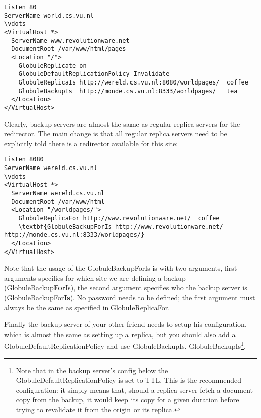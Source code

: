 \documentclass[10pt,a4paper]{article}
\makeatletter
\newenvironment{p}{\@open{P}{}}{\@close{P}}
\newenvironment{p}{}{\par}
\makeatother
\begin{document}
\begin{Verbatim}[label=Your origin server's configuration]
Listen 80
ServerName world.cs.vu.nl
\vdots
<VirtualHost *>
  ServerName www.revolutionware.net
  DocumentRoot /var/www/html/pages
  <Location "/">
    GlobuleReplicate on
    GlobuleDefaultReplicationPolicy Invalidate
    GlobuleReplicaIs http://wereld.cs.vu.nl:8080/worldpages/  coffee
    GlobuleBackupIs  http://monde.cs.vu.nl:8333/worldpages/   tea
  </Location>
</VirtualHost>
\end{Verbatim}

\begin{p}
Clearly, backup servers are almost the same as regular replica servers for the
redirector.  The main change is that all regular replica servers need to be
explicitly told there is a redirector available for this site:
\end{p}

\begin{Verbatim}[label=Configuration for Friend with regular replica]
Listen 8080
ServerName wereld.cs.vu.nl
\vdots
<VirtualHost *>
  ServerName wereld.cs.vu.nl
  DocumentRoot /var/www/html
  <Location "/worldpages/">
    GlobuleReplicaFor http://www.revolutionware.net/  coffee
    \textbf{GlobuleBackupForIs http://www.revolutionware.net/ http://monde.cs.vu.nl:8333/worldpages/}
  </Location>
</VirtualHost>
\end{Verbatim}

\begin{p}
Note that the usage of the GlobuleBackupForIs is with two arguments, first
arguments specifies for which site we are defining a backup
(GlobuleBackup\textbf{For}Is), the second argument specifies who the backup
server is (GlobuleBackupFor\textbf{Is}).  No password needs to be defined; the
first argument must always be the same as specified in GlobuleReplicaFor.
\end{p}

\begin{p}
Finally the backup server of your other friend needs to setup his
configuration, which is almost the same as setting up a replica, but you
should also add a GlobuleDefaultReplicationPolicy and use GlobuleBackupIs.
GlobuleBackupIs\footnote{Note that in the backup server's config below the
GlobuleDefaultReplicationPolicy is set to TTL. This is the recommended
configuration: it simply means that, should a replica server fetch a document
copy from the backup, it would keep its copy for a given duration before
trying to revalidate it from the origin or its replica.}.
\end{p}
\end{document}
